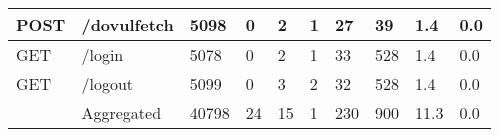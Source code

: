 \begin{table*}[h]
\begin{tabular}{|p{}|p{}|p{}|p{}|p{}|p{}|p{}|p{}|p{}|p{}|}
    POST                                  & /dovulfetch                        & 5098                                      & 0                                      & 2                                          & 1                                      & 27                                     & 39                                                 & 1.4                               & 0.0                                      \\ \hline
    GET                                   & /login                             & 5078                                      & 0                                      & 2                                          & 1                                      & 33                                     & 528                                                & 1.4                               & 0.0                                      \\ \hline
    GET                                   & /logout                            & 5099                                      & 0                                      & 3                                          & 2                                      & 32                                     & 528                                                & 1.4                               & 0.0                                      \\ \hline
                                          & Aggregated                         & 40798                                     & 24                                     & 15                                         & 1                                      & 230                                    & 900                                                & 11.3                              & 0.0                                      \\ \hline
    \end{tabular}
  \end{table*}